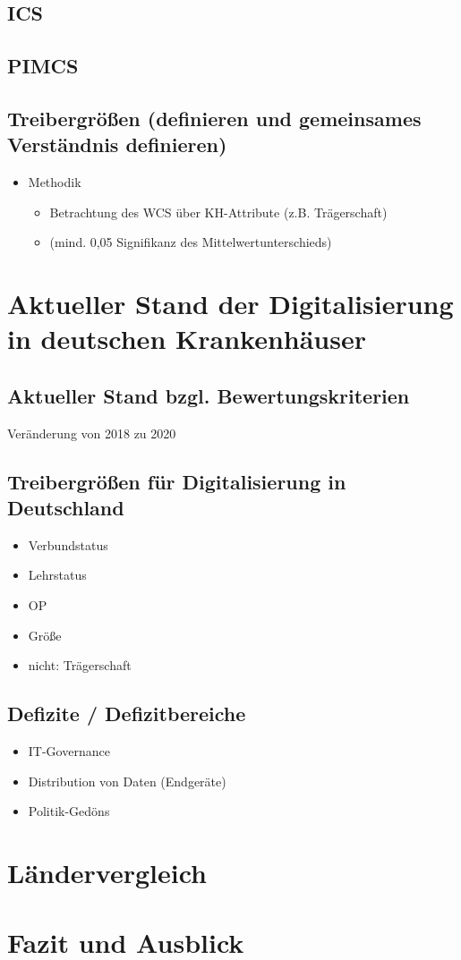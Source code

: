 	\subsection{ICS}
	\subsection{PIMCS}
	\subsection{Treibergrößen (definieren und gemeinsames Verständnis definieren)}
	\begin{itemize}
		\item Methodik
		\begin{itemize}
			\item Betrachtung des WCS über KH-Attribute (z.B. Trägerschaft)
			\item (mind. 0,05 Signifikanz des Mittelwertunterschieds)
		\end{itemize}
	\end{itemize}
\section{Aktueller Stand der Digitalisierung in deutschen Krankenhäuser}
	\subsection{Aktueller Stand bzgl. Bewertungskriterien}
		Veränderung von 2018 zu 2020
	\subsection{Treibergrößen für Digitalisierung in Deutschland}
	\begin{itemize}
		\item Verbundstatus \parencite{cresswell2013}
		\item Lehrstatus
		\item OP
		\item Größe \parencite{cresswell2013}
		\item nicht: Trägerschaft \parencite{cresswell2013}
	\end{itemize}
	\subsection{Defizite / Defizitbereiche}
	\begin{itemize}
		\item IT-Governance
		\item Distribution von Daten (Endgeräte)
		\item Politik-Gedöns
	\end{itemize}
\section{Ländervergleich}

\section{Fazit und Ausblick}
\newpage
{}
\setcounter{page}{3}
\printbibliography
{}

